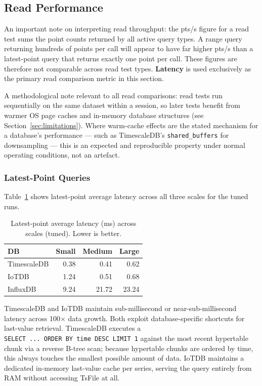 \subsection{Read Performance}
\label{sec:read-results}

An important note on interpreting read throughput: the pts/s figure for a read test sums
the point counts returned by all active query types. A range query returning hundreds of
points per call will appear to have far higher pts/s than a latest-point query that returns
exactly one point per call. These figures are therefore not comparable across read test types.
\textbf{Latency} is used exclusively as the primary read comparison metric in this section.

A methodological note relevant to all read comparisons: read tests run sequentially on the
same dataset within a session, so later tests benefit from warmer OS page caches and
in-memory database structures (see Section~\ref{sec:limitations}). Where warm-cache effects
are the stated mechanism for a database's performance --- such as TimescaleDB's
\texttt{shared\_buffers} for downsampling --- this is an expected and reproducible property
under normal operating conditions, not an artefact.

\subsubsection{Latest-Point Queries}

Table~\ref{tab:latest} shows latest-point average latency across all three scales for the
tuned runs.

\begin{table}[ht]
  \centering
  \caption{Latest-point average latency (ms) across scales (tuned). Lower is better.}
  \label{tab:latest}
  \begin{tabular}{lrrr}
    \hline
    \textbf{DB} & \textbf{Small} & \textbf{Medium} & \textbf{Large} \\
    \hline
    TimescaleDB &  0.38 &  0.41 &  0.62 \\
    IoTDB       &  1.24 &  0.51 &  0.68 \\
    InfluxDB    &  9.24 & 21.72 & 23.24 \\
    \hline
  \end{tabular}
\end{table}

TimescaleDB and IoTDB maintain sub-millisecond or near-sub-millisecond latency across
100$\times$ data growth. Both exploit database-specific shortcuts for last-value retrieval.
TimescaleDB executes a \texttt{SELECT~...~ORDER~BY~time~DESC~LIMIT~1} against the most
recent hypertable chunk via a reverse B-tree scan; because hypertable chunks are ordered
by time, this always touches the smallest possible amount of data. IoTDB maintains a
dedicated in-memory last-value cache per series, serving the query entirely from RAM
without accessing TsFile at all.

